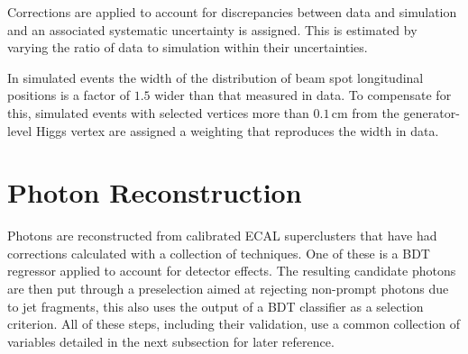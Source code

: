 Corrections are applied to account for discrepancies between data and simulation and an associated systematic uncertainty is assigned. This is estimated by varying the ratio of data to simulation within their uncertainties. 

In simulated events the width of the distribution of beam spot longitudinal positions is a factor of $1.5$ wider than that measured in data. 
To compensate for this, simulated events with selected vertices more than $0.1$\,cm from the generator-level Higgs vertex are assigned a weighting that reproduces the width in data. 




\section{Photon Reconstruction}
Photons are reconstructed from calibrated ECAL superclusters that have had corrections calculated with a collection of techniques. One of these is a BDT regressor applied to account for detector effects. The resulting candidate photons are then put through a preselection aimed at rejecting non-prompt photons due to jet fragments, this also uses the output of a BDT classifier as a selection criterion.
All of these steps, including their validation, use a common collection of variables detailed in the next subsection for later reference. 

